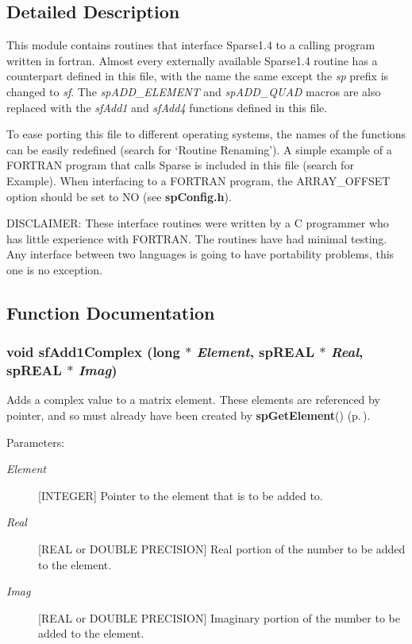 \subsection{Detailed Description}
 This module contains routines that interface Sparse1.4 to a calling program written in fortran. Almost every externally available Sparse1.4 routine has a counterpart defined in this file, with the name the same except the {\em sp} prefix is changed to {\em sf}. The {\em sp\-ADD\_\-ELEMENT} and {\em sp\-ADD\_\-QUAD} macros are also replaced with the {\em sf\-Add1} and {\em sf\-Add4} functions defined in this file.

To ease porting this file to different operating systems, the names of the functions can be easily redefined (search for `Routine Renaming'). A simple example of a FORTRAN program that calls Sparse is included in this file (search for Example). When interfacing to a FORTRAN program, the ARRAY\_\-OFFSET option should be set to NO (see {\bf sp\-Config.h}).

DISCLAIMER: These interface routines were written by a C programmer who has little experience with FORTRAN. The routines have had minimal testing. Any interface between two languages is going to have portability problems, this one is no exception.



\subsection{Function Documentation}
\subsubsection{\setlength{\rightskip}{0pt plus 5cm}void sf\-Add1Complex (long $\ast$ {\em Element}, sp\-REAL $\ast$ {\em Real}, sp\-REAL $\ast$ {\em Imag})}\label{spFortran_8c_a57}


Adds a complex value to a matrix element. These elements are referenced by pointer, and so must already have been created by {\bf sp\-Get\-Element}() {\rm (p.\,\pageref{spBuild_8c_a12})}.\begin{Desc}
\item[Parameters: ]\par
\begin{description}
\item[{\em 
Element}][INTEGER] Pointer to the element that is to be added to. \item[{\em 
Real}][REAL or DOUBLE PRECISION] Real portion of the number to be added to the element. \item[{\em 
Imag}][REAL or DOUBLE PRECISION] Imaginary portion of the number to be added to the element. \end{description}
\end{Desc}
